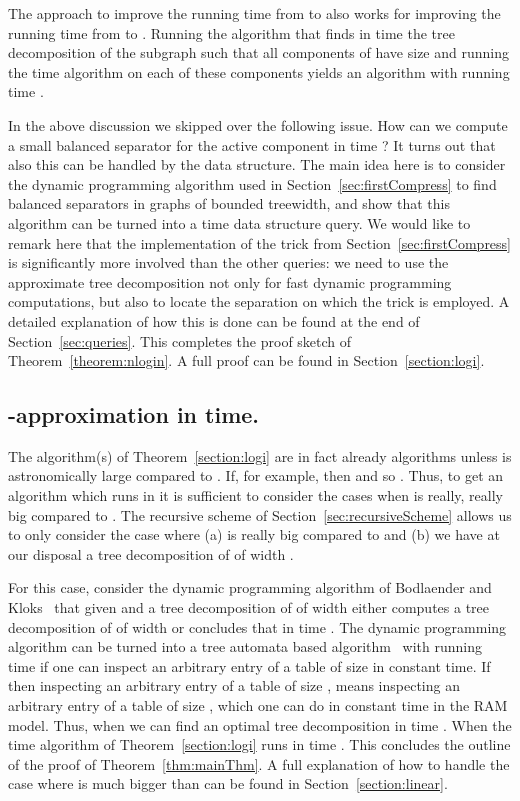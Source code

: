 \documentclass[a4paper,11pt]{article}
\theoremstyle{definition}
\theoremstyle{remark}
\begin{document}
The approach to improve the running time from  to
 also works for improving the running time from
 to .  Running the algorithm that finds in  time the tree
decomposition of the subgraph  such that all components of  have size  and running the  time algorithm on each of these components yields
an algorithm with running time .

In the above discussion we skipped over the following issue.  How can
we compute a small balanced separator for the active component in time
? It turns out that also this can be handled by the
data structure.  The main idea here is to consider the dynamic
programming algorithm used in Section~\ref{sec:firstCompress} to find
balanced separators in graphs of bounded treewidth, and show that this
algorithm can be turned into a  time data structure
query.  We would like to remark here that the implementation of the
trick from Section~\ref{sec:firstCompress} is significantly more
involved than the other queries: we need to use the approximate tree
decomposition not only for fast dynamic programming computations, but
also to locate the separation  on which the trick is
employed.  A detailed explanation of how this is done can be found at
the end of Section~\ref{sec:queries}.  This completes the proof sketch
of Theorem~\ref{theorem:nlogin}.  A full proof can be found in
Section~\ref{section:logi}.

\subsection{-approximation in  time.}
The algorithm(s) of Theorem~\ref{section:logi} are in fact already
 algorithms unless  is astronomically large compared to
.  If, for example,  then 
and so .  Thus, to get an algorithm
which runs in  it is sufficient to consider the cases when
 is really, really big compared to .  The recursive scheme of
Section~\ref{sec:recursiveScheme} allows us to only consider the case
where (a)  is really big compared to  and (b) we have at our
disposal a tree decomposition  of  of width .

For this case, consider the dynamic programming algorithm of
Bodlaender and Kloks~\cite{BodlaenderK96} that given  and a tree
decomposition  of  of width  either computes a tree
decomposition of  of width  or concludes that  in
time .  The dynamic programming algorithm can be
turned into a tree automata based
algorithm~\cite{FellowsL89,AbrahamsonF93} with running time
 if one can inspect an arbitrary entry of a
table of size  in constant time.  If  then inspecting an arbitrary entry of a table
of size , means inspecting an arbitrary entry of a
table of size , which one can do in constant time in the RAM
model.  Thus, when  we can find an
optimal tree decomposition in time .  When  the  time algorithm of
Theorem~\ref{section:logi} runs in time .  This concludes
the outline of the proof of Theorem~\ref{thm:mainThm}.  A full
explanation of how to handle the case where  is much bigger than
 can be found in Section~\ref{section:linear}.
\end{document}
